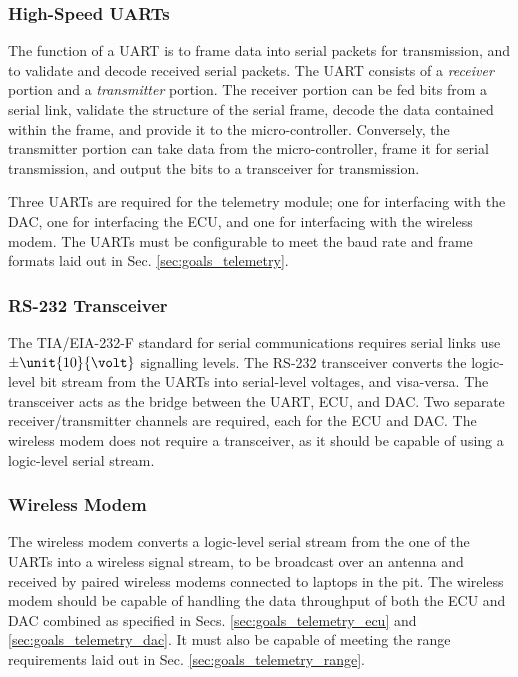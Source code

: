 \subsubsection{High-Speed UARTs}

The function of a UART is to frame data into serial packets for transmission, and to validate and decode received serial packets. The UART consists of a \emph{receiver} portion and a \emph{transmitter} portion. The receiver portion can be fed bits from a serial link, validate the structure of the serial frame, decode the data contained within the frame, and provide it to the micro-controller. Conversely, the transmitter portion can take data from the micro-controller, frame it for serial transmission, and output the bits to a transceiver for transmission.

Three UARTs are required for the telemetry module; one for interfacing with the DAC, one for interfacing the ECU, and one for interfacing with the wireless modem. The UARTs must be configurable to meet the baud rate and frame formats laid out in Sec. \ref{sec:goals_telemetry}.

\subsubsection{RS-232 Transceiver\label{sec:design_telemetry_rs232}}

The TIA/EIA-232-F standard for serial communications requires serial links use $\pm \unit{10}{\volt}$ signalling levels. The RS-232 transceiver converts the logic-level bit stream from the UARTs into serial-level voltages, and visa-versa. The transceiver acts as the bridge between the UART, ECU, and DAC. Two separate receiver/transmitter channels are required, each for the ECU and DAC. The wireless modem does not require a transceiver, as it should be capable of using a logic-level serial stream.

\subsubsection{Wireless Modem}

The wireless modem converts a logic-level serial stream from the one of the UARTs into a wireless signal stream, to be broadcast over an antenna and received by paired wireless modems connected to laptops in the pit. The wireless modem should be capable of handling the data throughput of both the ECU and DAC combined as specified in Secs. \ref{sec:goals_telemetry_ecu} and \ref{sec:goals_telemetry_dac}. It must also be capable of meeting the range requirements laid out in Sec. \ref{sec:goals_telemetry_range}.

